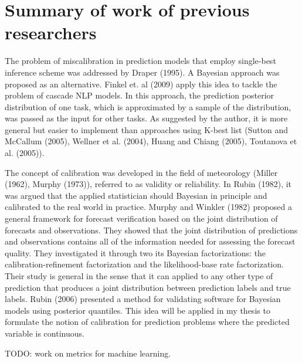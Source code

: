 \chapter{Summary of work of previous researchers}
\doublespacenormalsize
The problem of miscalibration in prediction models that employ single-best inference scheme was addressed by Draper (1995). A Bayesian approach was proposed as an alternative. Finkel et. al (2009) apply this idea to tackle the problem of cascade NLP models. In this approach, the prediction posterior distribution of one task, which is approximated by a sample of the distribution, was passed as the input for other tasks. As suggested by the author, it is more general but easier to implement than approaches using K-best list (Sutton and McCallum (2005), Wellner et al. (2004), Huang and Chiang (2005), Toutanova et al. (2005)).

The concept of calibration was developed in the field of meteorology (Miller (1962), Murphy (1973)), referred to as validity or reliability. In Rubin (1982), it was argued that the applied statistician should Bayesian in principle and calibrated to the real world in practice. Murphy and Winkler (1982) proposed a general framework for forecast verification based on the joint distribution of forecasts and observations. They showed that the joint distribution of predictions and observations contains all of the information needed for assessing the forecast quality. They investigated it through two its Bayesian factorizations: the calibration-refinement factorization and the likelihood-base rate factorization. Their study is general in the sense that it can applied to any other type of prediction that produces a joint distribution between prediction labels and true labels. Rubin (2006) presented a method for validating software for Bayesian models using posterior quantiles. This idea will be applied in my thesis to formulate the notion of calibration for prediction problems where the predicted variable is continuous. 

TODO: work on metrics for machine learning.

